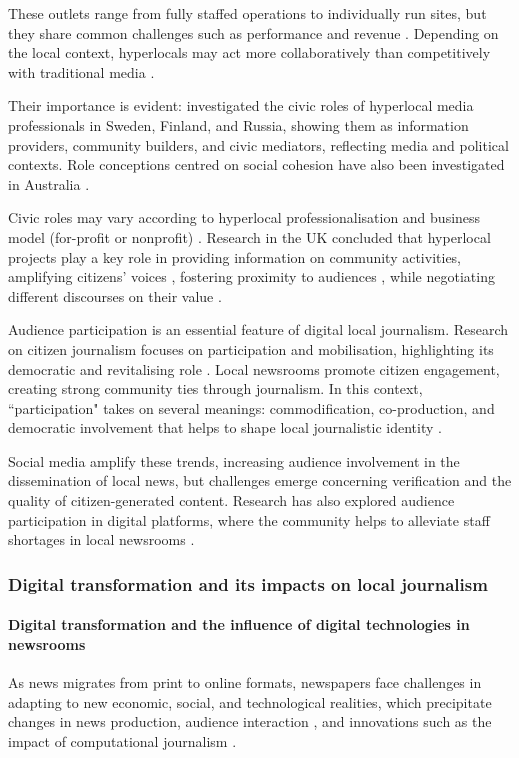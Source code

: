 \documentclass[english]{textolivre}
\begin{document}
These outlets range from fully staffed operations to individually run sites, but they share common challenges such as performance and revenue \cite{vankerkhoven2014}. Depending on the local context, hyperlocals may act more collaboratively than competitively with traditional media \cite{dovbysh2021}.

Their importance is evident: \textcite{hujanen2021} investigated the civic roles of hyperlocal media professionals in Sweden, Finland, and Russia, showing them as information providers, community builders, and civic mediators, reflecting media and political contexts. Role conceptions centred on social cohesion have also been investigated in Australia \cite{barnes2022}.

Civic roles may vary according to hyperlocal professionalisation and business model (for-profit or nonprofit) \cite{tenor2018}. Research in the UK concluded that hyperlocal projects play a key role in providing information on community activities, amplifying citizens’ voices \cite{williams2015}, fostering proximity to audiences \cite{harte2017}, while negotiating different discourses on their value \cite{harte2023}.

Audience participation is an essential feature of digital local journalism. Research on citizen journalism focuses on participation and mobilisation, highlighting its democratic and revitalising role \cite{harcap2016, blom2014}. Local newsrooms promote citizen engagement, creating strong community ties through journalism. In this context, ``participation" takes on several meanings: commodification, co-production, and democratic involvement that helps to shape local journalistic identity \cite{carlsson2016}.

Social media amplify these trends, increasing audience involvement in the dissemination of local news, but challenges emerge concerning verification and the quality of citizen-generated content. Research has also explored audience participation in digital platforms, where the community helps to alleviate staff shortages in local newsrooms \cite{cook2021}.

\subsubsection{Digital transformation and its impacts on local journalism}
\paragraph{Digital transformation and the influence of digital technologies in newsrooms}
As news migrates from print to online formats, newspapers face challenges in adapting to new economic, social, and technological realities, which  precipitate changes in news production, audience interaction \cite{anderson2013}, and innovations such as the impact of computational journalism \cite{young2015}.
\end{document}
